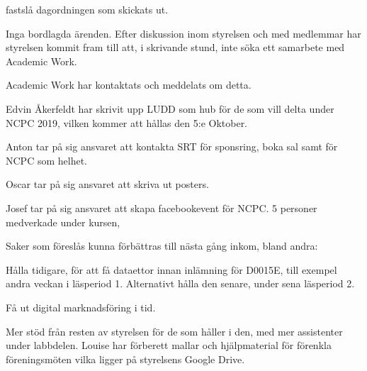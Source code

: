\documentclass{protokoll}
\date{2019-09-24}  %
\begin{document}
\newpage  


\begin{beslut}
     \att fastslå dagordningen som skickats ut.
\end{beslut}

Inga bordlagda ärenden.
Efter diskussion inom styrelsen och med medlemmar har styrelsen kommit fram
till att, i skrivande stund, inte söka ett samarbete med Academic Work. 


Academic Work har kontaktats och meddelats om detta.

Edvin Åkerfeldt har skrivit upp LUDD som hub för de som vill delta under NCPC 
2019, vilken kommer att hållas den 5:e Oktober. 


Anton tar på sig ansvaret att kontakta SRT för sponsring, boka sal samt för 
NCPC som helhet.


Oscar tar på sig ansvaret att skriva ut posters. 

Josef tar på sig ansvaret att skapa facebookevent för NCPC.
5 personer medverkade under kursen, 

Saker som föreslås kunna förbättras till nästa gång inkom, bland andra: 


Hålla tidigare, för att få dataettor innan inlämning för D0015E, till exempel 
andra veckan i läsperiod 1. Alternativt hålla den senare, under sena läsperiod
2.  


Få ut digital marknadsföring i tid. 


Mer stöd från resten av styrelsen för de som håller i den, med mer assistenter
under labbdelen. 
Louise har förberett mallar och hjälpmaterial för förenkla föreningsmöten vilka 
ligger på styrelsens Google Drive. 
\end{document}
